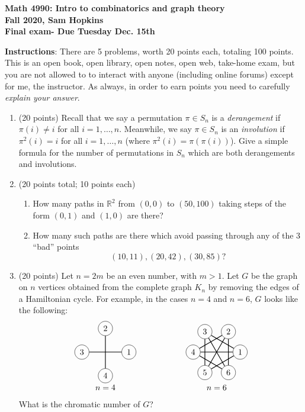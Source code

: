 \documentclass[11pt]{article}
\begin{document}
\begin{center}
{\bf Math 4990: Intro to combinatorics and graph theory \\
Fall 2020, Sam Hopkins \\
Final exam- Due Tuesday Dec. 15th}
\end{center}

{\bf Instructions}: There are 5 problems, worth 20 points each, totaling 100 points. This is an open book, open library, open notes, open web, take-home exam, but you are not allowed to to interact with anyone (including online forums) except for me, the instructor. As always, in order to earn points you need to carefully \emph{explain your answer}.

\begin{enumerate}

\item (20 points) Recall that we say a permutation $\pi \in S_n$ is a \emph{derangement} if $\pi(i)\neq i$ for all $i=1,\ldots,n$. Meanwhile, we say $\pi \in S_n$ is an \emph{involution} if $\pi^{2}(i)=i$ for all $i=1,\ldots,n$ (where $\pi^2(i)=\pi(\pi(i))$). Give a simple formula for the number of permutations in $S_n$ which are both derangements and involutions.

\item (20 points total; 10 points each)
\begin{enumerate}
\item How many paths in $\mathbb{R}^2$ from $(0,0)$ to $(50,100)$ taking steps of the form $(0,1)$ and $(1,0)$ are there?
\item  How many such paths are there which avoid passing through any of the 3 ``bad'' points
\[(10, 11), (20, 42), (30, 85)?\]
\end{enumerate}

\item (20 points) Let $n=2m$ be an even number, with $m > 1$. Let $G$ be the graph on $n$ vertices obtained from the complete graph $K_n$ by removing the edges of a Hamiltonian cycle. For example, in the cases $n=4$ and $n=6$, $G$ looks like the following:
\[ \begin{tikzpicture}
\node[draw, circle] (1) at (0:1) {1};
\node[draw, circle] (2) at (90:1) {2};
\node[draw, circle] (3) at (180:1) {3};
\node[draw, circle] (4) at (270:1) {4};
\node at (270:1.5) {$n=4$};
\draw[thick] (1)--(3);
\draw[thick] (2)--(4);
\end{tikzpicture} \qquad \qquad \qquad \begin{tikzpicture}
\node[draw, circle] (1) at (0:1) {1};
\node[draw, circle] (2) at (60:1) {2};
\node[draw, circle] (3) at (120:1) {3};
\node[draw, circle] (4) at (180:1) {4};
\node[draw, circle] (5) at (240:1) {5};
\node[draw, circle] (6) at (300:1) {6};
\node at (270:1.5) {$n=6$};
\draw[thick] (1)--(3)--(5)--(1);
\draw[thick] (2)--(4)--(6)--(2);
\draw[thick] (1)--(4);
\draw[thick] (2)--(5);
\draw[thick] (3)--(6);
\end{tikzpicture} \]
What is the chromatic number of $G$?
\end{enumerate}
\end{document}
